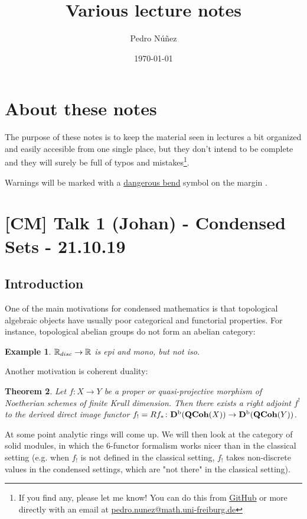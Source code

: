 \documentclass[A4paper, british, reqno]{amsart}
\author{Pedro Núñez}
\title[Various lecture notes]{Various lecture notes}
\date{\today}
\theoremstyle{darkgreentheorem}
\newtheorem{thm}{Theorem}[section]
\theoremstyle{darkbluedefinition}
\theoremstyle{darkredexample}
\newtheorem{exa}[thm]{Example}
\theoremstyle{remark}
\newcommand{\1}{\mathbbm{1}}
\newcommand{\db}{\marginnote{\dbend}}
\begin{document}
\maketitle

\tableofcontents

\section{About these notes}

The purpose of these notes is to keep the material seen in lectures a bit organized and easily accesible from one single place, but they don't intend to be complete and they will surely be full of typos and mistakes\footnote{If you find any, please let me know! You can do this from \href{https://github.com/pedro-nlb/notes}{GitHub} or more directly with an email at \href{mailto:pedro.nunez@math.uni-freiburg.de}{pedro.nunez@math.uni-freiburg.de}}.

Warnings will be marked with a \href{https://en.wikipedia.org/wiki/Bourbaki_dangerous_bend_symbol}{dangerous bend} symbol on the margin \db.

\section{[CM] Talk 1 (Johan) - Condensed Sets - 21.10.19}

\subsection{Introduction}

One of the main motivations for condensed mathematics is that topological algebraic objects have usually poor categorical and functorial properties.
For instance, topological abelian groups do not form an abelian category:

\begin{exa}
    $\mathbb{R}_{disc}\to \mathbb{R}$ is epi and mono, but not iso.
\end{exa}

Another motivation is coherent duality:

\begin{thm}
    Let $f\colon X\to Y$ be a proper or quasi-projective morphism of Noetherian schemes of finite Krull dimension. Then there exists a right adjoint $f^{!}$ to the derived direct image functor $f_{!}=Rf_{*}\colon \mathbf{D}^{\mathrm{b}}(\mathbf{QCoh}(X))\to \mathbf{D}^{\mathrm{b}}(\mathbf{QCoh}(Y))$.
\end{thm}

At some point analytic rings will come up.
We will then look at the category of solid modules, in which the 6-functor formalism works nicer than in the classical setting (e.g. when $f_{!}$ is not defined in the classical setting, $f_{!}$ takes non-discrete values in the condensed settings, which are "not there" in the classical setting).
\end{document}
